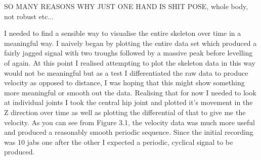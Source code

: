 SO MANY REASONS WHY JUST ONE HAND IS SHIT
POSE, whole body, not robust etc...

I needed to find a sensible way to visualise the entire skeleton over time in a meaningful way. I naively began by plotting the entire data set which produced a fairly jagged signal with two troughs followed by a massive peak before levelling of again. At this point I realised attempting to plot the skeleton data in this way would not be meaningful but as a test I differentiated the raw data to produce velocity as opposed to distance, I was hoping that this might show something more meaningful or smooth out the data.
Realising that for now I needed to look at individual joints I took the central hip joint and plotted it's movement in the Z direction over time as well as plotting the differential of that to give me the velocity. As you can see from Figure 3.1, the velocity data was much more useful and produced a reasonably smooth periodic sequence. Since the initial recording was 10 jabs one after the other I expected a periodic, cyclical signal to be produced.

